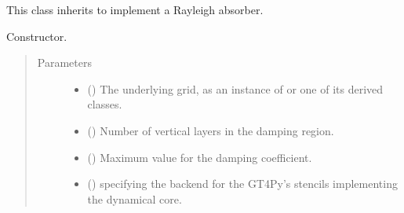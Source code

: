 \documentclass[letterpaper,10pt,english]{sphinxmanual}
\begin{document}
\begin{fulllineitems}
\label{\detokenize{api:dycore.vertical_damping.Rayleigh}}
This class inherits {\hyperref[\detokenize{api:dycore.vertical_damping.VerticalDamping}]{}} to implement a Rayleigh absorber.

\begin{fulllineitems}
\label{\detokenize{api:dycore.vertical_damping.Rayleigh.__init__}}
Constructor.
\begin{quote}\begin{description}
\item[{Parameters}] \leavevmode\begin{itemize}
\item {} 
 () \textendash{} The underlying grid, as an instance of {\hyperref[\detokenize{api:grids.grid_xyz.GridXYZ}]{}} or one of its derived classes.

\item {} 
 () \textendash{} Number of vertical layers in the damping region.

\item {} 
 () \textendash{} Maximum value for the damping coefficient.

\item {} 
 () \textendash{}  specifying the backend for the GT4Py’s stencils implementing the dynamical core.

\end{itemize}

\end{description}\end{quote}

\end{fulllineitems}



\end{fulllineitems}
\end{document}
